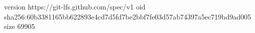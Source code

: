 version https://git-lfs.github.com/spec/v1
oid sha256:60b3381165bb622893e4cd7d5fd7be2bbf7fe03d57ab74397a5ec719bd9ad005
size 69905
